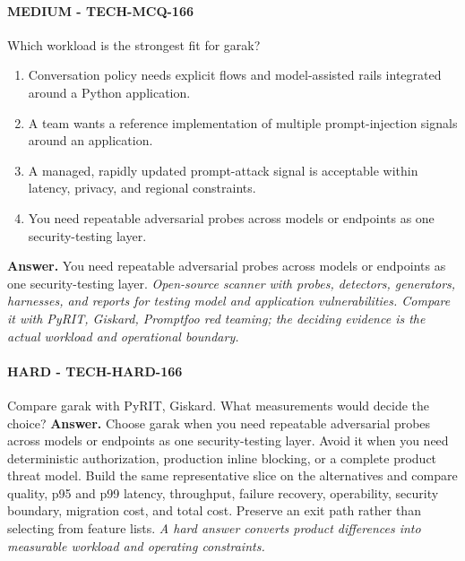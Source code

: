 \paragraph{MEDIUM - TECH-MCQ-166} Which workload is the strongest fit for garak?
\begin{enumerate}[label=\Alph*.]
\item Conversation policy needs explicit flows and model-assisted rails integrated around a Python application.
\item A team wants a reference implementation of multiple prompt-injection signals around an application.
\item A managed, rapidly updated prompt-attack signal is acceptable within latency, privacy, and regional constraints.
\item You need repeatable adversarial probes across models or endpoints as one security-testing layer.
\end{enumerate}
\textbf{Answer.} You need repeatable adversarial probes across models or endpoints as one security-testing layer.
\textit{Open-source scanner with probes, detectors, generators, harnesses, and reports for testing model and application vulnerabilities. Compare it with PyRIT, Giskard, Promptfoo red teaming; the deciding evidence is the actual workload and operational boundary.}
\paragraph{HARD - TECH-HARD-166} Compare garak with PyRIT, Giskard. What measurements would decide the choice?
\textbf{Answer.} Choose garak when you need repeatable adversarial probes across models or endpoints as one security-testing layer. Avoid it when you need deterministic authorization, production inline blocking, or a complete product threat model. Build the same representative slice on the alternatives and compare quality, p95 and p99 latency, throughput, failure recovery, operability, security boundary, migration cost, and total cost. Preserve an exit path rather than selecting from feature lists.
\textit{A hard answer converts product differences into measurable workload and operating constraints.}
